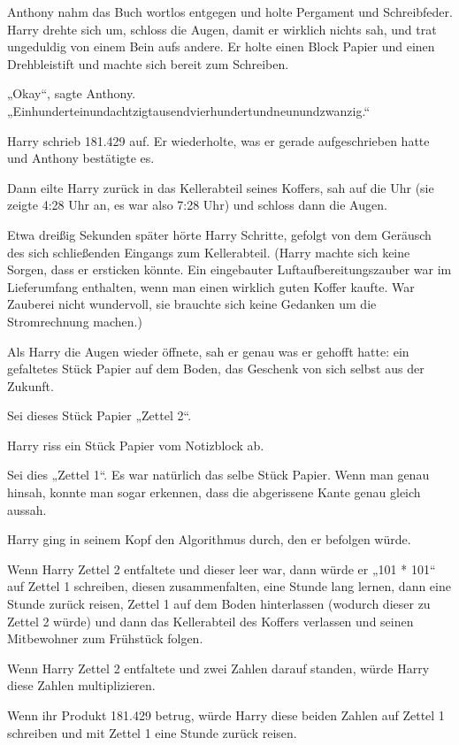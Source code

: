 {Anthony nahm das Buch wortlos entgegen und holte Pergament und Schreibfeder. Harry drehte sich um, schloss die Augen, damit er wirklich nichts sah, und trat ungeduldig von einem Bein aufs andere. Er holte einen Block Papier und einen Drehbleistift und machte sich bereit zum Schreiben.

„Okay“, sagte Anthony. „Einhunderteinundachtzigtausendvierhundertundneunundzwanzig.“

Harry schrieb 181.429 auf. Er wiederholte, was er gerade aufgeschrieben hatte und Anthony bestätigte es.

Dann eilte Harry zurück in das Kellerabteil seines Koffers, sah auf die Uhr (sie zeigte 4:28 Uhr an, es war also 7:28 Uhr) und schloss dann die Augen.

Etwa dreißig Sekunden später hörte Harry Schritte, gefolgt von dem Geräusch des sich schließenden Eingangs zum Kellerabteil. (Harry machte sich keine Sorgen, dass er ersticken könnte. Ein eingebauter Luftaufbereitungszauber war im Lieferumfang enthalten, wenn man einen wirklich guten Koffer kaufte. War Zauberei nicht wundervoll, sie brauchte sich keine Gedanken um die Stromrechnung machen.)

Als Harry die Augen wieder öffnete, sah er genau was er gehofft hatte: ein gefaltetes Stück Papier auf dem Boden, das Geschenk von sich selbst aus der Zukunft.

Sei dieses Stück Papier „Zettel 2“.

Harry riss ein Stück Papier vom Notizblock ab.

Sei dies „Zettel 1“. Es war natürlich das selbe Stück Papier. Wenn man genau hinsah, konnte man sogar erkennen, dass die abgerissene Kante genau gleich aussah.

Harry ging in seinem Kopf den Algorithmus durch, den er befolgen würde.

Wenn Harry Zettel 2 entfaltete und dieser leer war, dann würde er „101 * 101“ auf Zettel 1 schreiben, diesen zusammenfalten, eine Stunde lang lernen, dann eine Stunde zurück reisen, Zettel 1 auf dem Boden hinterlassen (wodurch dieser zu Zettel 2 würde) und dann das Kellerabteil des Koffers verlassen und seinen Mitbewohner zum Frühstück folgen.

Wenn Harry Zettel 2 entfaltete und zwei Zahlen darauf standen, würde Harry diese Zahlen multiplizieren.

Wenn ihr Produkt 181.429 betrug, würde Harry diese beiden Zahlen auf Zettel 1 schreiben und mit Zettel 1 eine Stunde zurück reisen.

}
